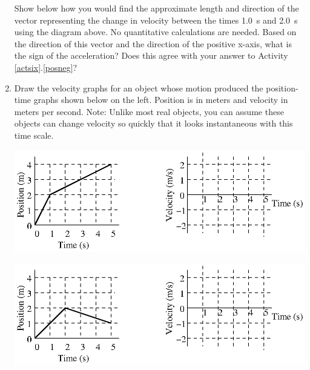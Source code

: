 \begin{enumerate}
\newpage

Show below how you would find the approximate length and direction of the
vector representing the change in velocity between the times 1.0~s and 2.0~s
using the diagram above. No quantitative calculations are needed. Based on the
direction of this vector and the direction of the positive x-axis, what is the
sign of the acceleration? Does this agree with your answer to Activity \ref{actsix}.\ref{posneg}?
\vspace{20mm}

\item Draw the velocity graphs for an object whose motion produced the position-time
graphs shown below on the left. Position is in meters and velocity in meters
per second. Note: Unlike most real objects, you can assume these objects can
change velocity so quickly that it looks instantaneous with this time scale.


\vspace{0.3cm}
{\par\centering \includegraphics{iqsRelatingMotion/relating_fig4.eps} \par}
\vspace{0.3cm}

\vspace{0.3cm}
{\par\centering \includegraphics{iqsRelatingMotion/relating_fig5.eps} \par}
\vspace{0.3cm}


\end{enumerate}
